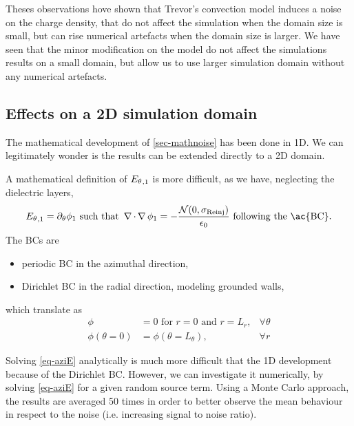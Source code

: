       Theses observations hove shown that Trevor's convection model induces a noise on the charge density, that do not affect the simulation when the domain size is small, but can rise numerical artefacts when the domain size is larger.
      We have seen that the minor modification on the model do not affect the simulations results on a small domain, but allow us to use larger simulation domain without any numerical artefacts.
      
    
    \subsection{Effects on a \ac{2D} simulation domain}
      
      The mathematical development of \cref{sec-mathnoise} has been done in \ac{1D}.
      We can legitimately wonder is the results  can be extended directly to a \ac{2D} domain.
      
      A mathematical definition of ${E_{\theta}}_{, 1}$ is more difficult, as we have, neglecting the dielectric layers,
      \begin{equation} \label{eq-aziE}
        \aziE_{, 1} = \partial_{\theta} \phi_1 \text{ such that } \grad \cdot \grad \phi_1 = - \frac { \N(0, \stdconv)}{\epsilon_0} \text{ following the \ac{BC}}.
      \end{equation}
      The \ac{BC}s are
      \begin{itemize}
        \item periodic \ac{BC} in the azimuthal direction,
        \item Dirichlet \ac{BC} in the radial direction, modeling grounded walls,
      \end{itemize}
      which translate as
      \begin{align}
        \phi &= 0 \text{ for } r=0 \text{ and } r=L_r, &\forall \theta\\
        \phi(\theta = 0)&= \phi(\theta = L_{\theta}) , &\forall r
      \end{align}
      
      Solving \cref{eq-aziE} analytically is much more difficult that the \ac{1D} development because of the Dirichlet \ac{BC}.
      However, we can investigate it numerically, by solving \cref{eq-aziE} for a given random source term.
      Using a Monte Carlo approach, the results are averaged 50 times in order to better observe the mean behaviour in respect to the noise (i.e. increasing signal to noise ratio).
        
